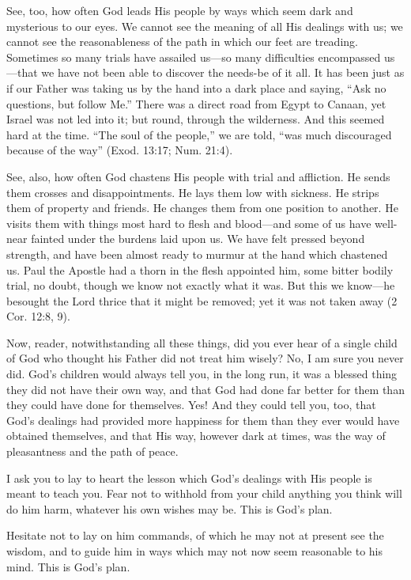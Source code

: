 \documentclass[
]{book}
\begin{document}
See, too, how often God leads His people by ways which seem dark and mysterious to our eyes. We cannot see the meaning of all His dealings with us; we cannot see the reasonableness of the path in which our feet are treading. Sometimes so many trials have assailed us---so many difficulties encompassed us---that we have not been able to discover the needs-be of it all. It has been just as if our Father was taking us by the hand into a dark place and saying, ``Ask no questions, but follow Me.'' There was a direct road from Egypt to Canaan, yet Israel was not led into it; but round, through the wilderness. And this seemed hard at the time. ``The soul of the people,'' we are told, ``was much discouraged because of the way'' (Exod. 13:17; Num. 21:4).

See, also, how often God chastens His people with trial and affliction. He sends them crosses and disappointments. He lays them low with sickness. He strips them of property and friends. He changes them from one position to another. He visits them with things most hard to flesh and blood---and some of us have well-near fainted under the burdens laid upon us. We have felt pressed beyond strength, and have been almost ready to murmur at the hand which chastened us. Paul the Apostle had a thorn in the flesh appointed him, some bitter bodily trial, no doubt, though we know not exactly what it was. But this we know---he besought the Lord thrice that it might be removed; yet it was not taken away (2 Cor. 12:8, 9).

Now, reader, notwithstanding all these things, did you ever hear of a single child of God who thought his Father did not treat him wisely? No, I am sure you never did. God's children would always tell you, in the long run, it was a blessed thing they did not have their own way, and that God had done far better for them than they could have done for themselves. Yes! And they could tell you, too, that God's dealings had provided more happiness for them than they ever would have obtained themselves, and that His way, however dark at times, was the way of pleasantness and the path of peace.

I ask you to lay to heart the lesson which God's dealings with His people is meant to teach you. Fear not to withhold from your child anything you think will do him harm, whatever his own wishes may be. This is God's plan.

Hesitate not to lay on him commands, of which he may not at present see the wisdom, and to guide him in ways which may not now seem reasonable to his mind. This is God's plan.
\end{document}
